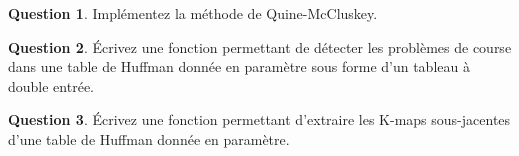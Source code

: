 \documentclass[11pt,a4paper,dvipsnames]{article}
\theoremstyle{definition}%
\newtheorem{Q}{Question}[] %
\begin{document}
\begin{Q}
Implémentez la méthode de Quine-McCluskey.
\end{Q}


\begin{Q}
Écrivez une fonction permettant de détecter les problèmes de course dans une table de Huffman donnée en paramètre sous forme d'un tableau à double entrée.
\end{Q}


\begin{Q}
Écrivez une fonction permettant d'extraire les K-maps sous-jacentes d'une table de Huffman donnée en paramètre.
\end{Q}
\end{document}

